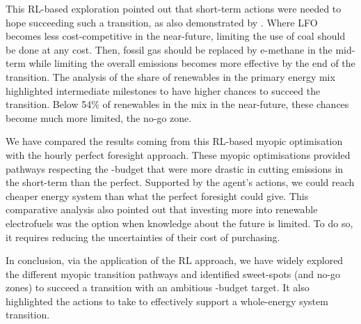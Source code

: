 
This \gls{RL}-based exploration pointed out that short-term actions were needed to hope succeeding such a transition, as also demonstrated by \citet{luderer2018residual}. Where \gls{LFO} becomes less cost-competitive in the near-future, limiting the use of coal should be done at any cost. Then, fossil gas should be replaced by e-methane in the mid-term while limiting the overall emissions becomes more effective by the end of the transition. The analysis of the share of renewables in the primary energy mix highlighted intermediate milestones to have higher chances to succeed the transition. Below 54\% of renewables in the mix in the near-future, these chances become much more limited, \ie the no-go zone. 

We have compared the results coming from this \gls{RL}-based myopic optimisation with the hourly perfect foresight approach. These myopic optimisations provided pathways respecting the -budget that were more drastic in cutting emissions in the short-term than the perfect. Supported by the agent's actions, we could reach cheaper energy system than what the perfect foresight could give. This comparative analysis also pointed out that investing more into renewable electrofuels was the option when knowledge about the future is limited. To do so, it requires reducing the uncertainties of their cost of purchasing. 

In conclusion, via the application of the \gls{RL} approach, we have widely explored the different myopic transition pathways and identified sweet-spots (and no-go zones) to succeed a transition with an ambitious -budget target. It also highlighted the actions to take to effectively support a whole-energy system transition.